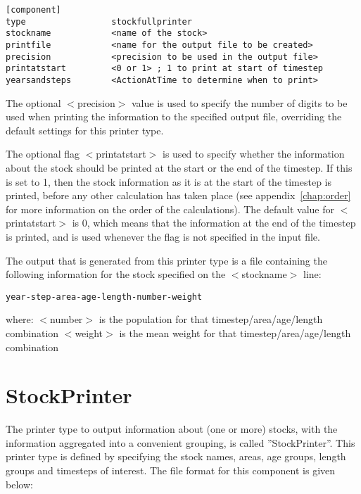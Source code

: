 \documentclass[10pt,twoside]{book}
\begin{document}
{\small\begin{verbatim}
[component]
type                 stockfullprinter
stockname            <name of the stock>
printfile            <name for the output file to be created>
precision            <precision to be used in the output file>
printatstart         <0 or 1> ; 1 to print at start of timestep
yearsandsteps        <ActionAtTime to determine when to print>
\end{verbatim}}

The optional $<$precision$>$ value is used to specify the number of digits to be used when printing the information to the specified output file, overriding the default settings for this printer type.

\bigskip
The optional flag $<$printatstart$>$ is used to specify whether the information about the stock should be printed at the start or the end of the timestep.  If this is set to 1, then the stock information as it is at the start of the timestep is printed, before any other calculation has taken place (see appendix~\ref{chap:order} for more information on the order of the calculations).  The default value for $<$printatstart$>$ is 0, which means that the information at the end of the timestep is printed, and is used whenever the flag is not specified in the input file.

\bigskip
The output that is generated from this printer type is a file containing the following information for the stock specified on the $<$stockname$>$ line:

{\small\begin{verbatim}
year-step-area-age-length-number-weight
\end{verbatim}}

where:\newline
$<$number$>$ is the population for that timestep/area/age/length combination\newline
$<$weight$>$ is the mean weight for that timestep/area/age/length combination

\section{StockPrinter}\label{sec:stockprinter}
The printer type to output information about (one or more) stocks, with the information aggregated into a convenient grouping, is called ''StockPrinter''.  This printer type is defined by specifying the stock names, areas, age groups, length groups and timesteps of interest.  The file format for this component is given below:
\end{document}

